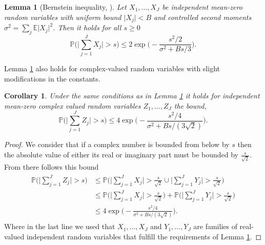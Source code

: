 \documentclass[11pt,reqno]{article}
\numberwithin{equation}{section}
\theoremstyle{definition}
\theoremstyle{plain}
\newtheorem{cor}[satz]{Corollary}
\newtheorem{lem}[satz]{Lemma}
\newcommand{\E}{\ensuremath{\mathbb{E}}}
\newcommand{\p}{\ensuremath{\mathbb{P}}}
\begin{document}
\begin{lem}[Bernstein inequality, {\cite[Cor.\ 7.31]{FoRa13}} ] \label{Bernstein}
    Let \(X_1, \ldots , X_J\) be independent mean-zero random variables with uniform bound \( \big\vert X_j \big\vert < B\) and controlled second moments \(\sigma^2 = \sum_j \E\big\vert X_j\big\vert^2\). Then it holds for all \(s \geq 0\)
\begin{equation}
    \p \Big( \Big\vert \sum_{j=1}^J X_j\Big\vert > s \Big) \leq 2\exp\Big(- \frac{s^2/2}{\sigma^2 + Bs/3} \Big).
\end{equation}
\end{lem}

Lemma \ref{Bernstein} also holds for complex-valued random variables with slight modifications in the constants. 
\begin{cor} \label{CBernstein}
Under the same conditions as in Lemma \ref{Bernstein} it holds for independent mean-zero complex valued random variables \(Z_1,\ldots,Z_J\) the bound,
\begin{equation}
    \p \Big( \Big\vert \sum_{j=1}^J Z_j\Big\vert > s \Big) \leq 4\exp\Big(- \frac{s^2/4}{\sigma^2 + Bs/(3\sqrt{2})} \Big).
\end{equation}
\end{cor}

\begin{proof}
    We consider that if a complex number is bounded from below by \(s\) then the absolute value of either its real or imaginary part must be bounded by \(\frac{s}{\sqrt{2}}\). From there follows this bound
\begin{align}
\begin{split}
        \p \Big( \Big\vert \sum_{j=1}^J Z_j \Big\vert > s \Big) & \leq \p \Big( \Big\vert \sum_{j=1}^J X_j \Big\vert > \frac{s}{\sqrt{2}} \cup \Big\vert \sum_{j=1}^J Y_j \Big\vert > \frac{s}{\sqrt{2}} \Big) \\
        & \leq \p \Big( \Big\vert \sum_{j=1}^J X_j \Big\vert > \frac{s}{\sqrt{2}} \Big) + \p \Big( \Big\vert \sum_{j=1}^J Y_j \Big\vert > \frac{s}{\sqrt{2}} \Big) \\
        & \leq 4 \exp \Big(- \frac{s^2/4}{\sigma^2 + Bs/(3\sqrt{2})}  \Big).
\end{split}
\end{align}
Where in the last line we used that \(X_1,\ldots, X_J\) and \(Y_1,\ldots,Y_J\) are families of real-valued independent random variables that fulfill the requirements of Lemma \ref{Bernstein}.
\end{proof}
\end{document}
